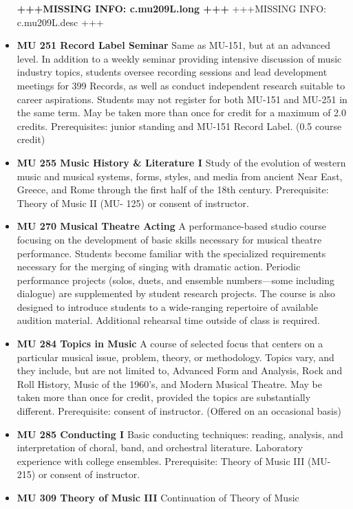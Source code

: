 \documentclass[
  letterpaper,
]{scrbook}
\begin{document}
\begin{itemize}
  \textbf{+++MISSING INFO: c.mu209L.long +++} +++MISSING INFO:
  c.mu209L.desc +++
\item
  \textbf{MU 251 Record Label Seminar} Same as MU-151, but at an
  advanced level. In addition to a weekly seminar providing intensive
  discussion of music industry topics, students oversee recording
  sessions and lead development meetings for 399 Records, as well as
  conduct independent research suitable to career aspirations. Students
  may not register for both MU-151 and MU-251 in the same term. May be
  taken more than once for credit for a maximum of 2.0 credits.
  Prerequisites: junior standing and MU-151 Record Label. (0.5 course
  credit)
\item
  \textbf{MU 255 Music History \& Literature I} Study of the evolution
  of western music and musical systems, forms, styles, and media from
  ancient Near East, Greece, and Rome through the first half of the 18th
  century. Prerequisite: Theory of Music II (MU- 125) or consent of
  instructor.
\item
  \textbf{MU 270 Musical Theatre Acting} A performance-based studio
  course focusing on the development of basic skills necessary for
  musical theatre performance. Students become familiar with the
  specialized requirements necessary for the merging of singing with
  dramatic action. Periodic performance projects (solos, duets, and
  ensemble numbers---some including dialogue) are supplemented by
  student research projects. The course is also designed to introduce
  students to a wide-ranging repertoire of available audition material.
  Additional rehearsal time outside of class is required.
\item
  \textbf{MU 284 Topics in Music} A course of selected focus that
  centers on a particular musical issue, problem, theory, or
  methodology. Topics vary, and they include, but are not limited to,
  Advanced Form and Analysis, Rock and Roll History, Music of the
  1960's, and Modern Musical Theatre. May be taken more than once for
  credit, provided the topics are substantially different. Prerequisite:
  consent of instructor. (Offered on an occasional basis)
\item
  \textbf{MU 285 Conducting I} Basic conducting techniques: reading,
  analysis, and interpretation of choral, band, and orchestral
  literature. Laboratory experience with college ensembles.
  Prerequisite: Theory of Music III (MU-215) or consent of instructor.
\item
  \textbf{MU 309 Theory of Music III} Continuation of Theory of Music

\end{itemize}
\end{document}
